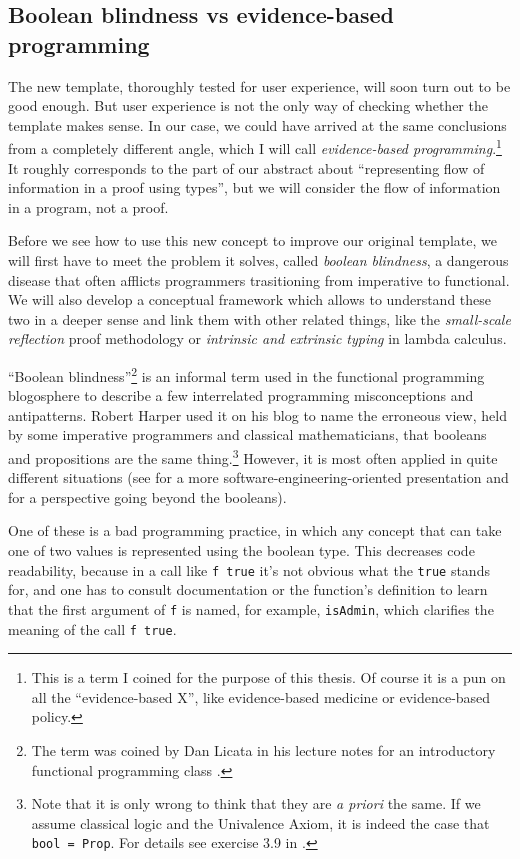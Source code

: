 \documentclass[declaration,mgr,english,shortabstract]{iithesis}
\newcommand{\m}[1]{\texttt{#1}}
\begin{document}
\subsection{Boolean blindness vs evidence-based programming}

The new template, thoroughly tested for user experience, will soon turn out to be good enough. But user experience is not the only way of checking whether the template makes sense. In our case, we could have arrived at the same conclusions from a completely different angle, which I will call \textit{evidence-based programming}.\footnote{This is a term I coined for the purpose of this thesis. Of course it is a pun on all the ``evidence-based X'', like evidence-based medicine or evidence-based policy.} It roughly corresponds to the part of our abstract about ``representing flow of information in a proof using types'', but we will consider the flow of information in a program, not a proof.

Before we see how to use this new concept to improve our original template, we will first have to meet the problem it solves, called \textit{boolean blindness}, a dangerous disease that often afflicts programmers trasitioning from imperative to functional. We will also develop a conceptual framework which allows to understand these two in a deeper sense and link them with other related things, like the \textit{small-scale reflection} proof methodology or \textit{intrinsic and extrinsic typing} in lambda calculus.

``Boolean blindness''\footnote{The term was coined by Dan Licata in his lecture notes for an introductory functional programming class \cite{BBLicata}.} is an informal term used in the functional programming blogosphere to describe a few interrelated programming misconceptions and antipatterns. Robert Harper used it on his blog \cite{BBHarper} to name the erroneous view, held by some imperative programmers and classical mathematicians, that booleans and propositions are the same thing.\footnote{Note that it is only wrong to think that they are \textit{a priori} the same. If we assume classical logic and the Univalence Axiom, it is indeed the case that \m{bool = Prop}. For details see exercise 3.9 in \cite{HoTTBook}.} However, it is most often applied in quite different situations (see \cite{BBFairbank} for a more software-engineering-oriented presentation and \cite{BBHXA} for a perspective going beyond the booleans).

One of these is a bad programming practice, in which any concept that can take one of two values is represented using the boolean type. This decreases code readability, because in a call like \m{f\ true} it's not obvious what the \m{true} stands for, and one has to consult documentation or the function's definition to learn that the first argument of \m{f} is named, for example, \m{isAdmin}, which clarifies the meaning of the call \m{f true}.
\end{document}
